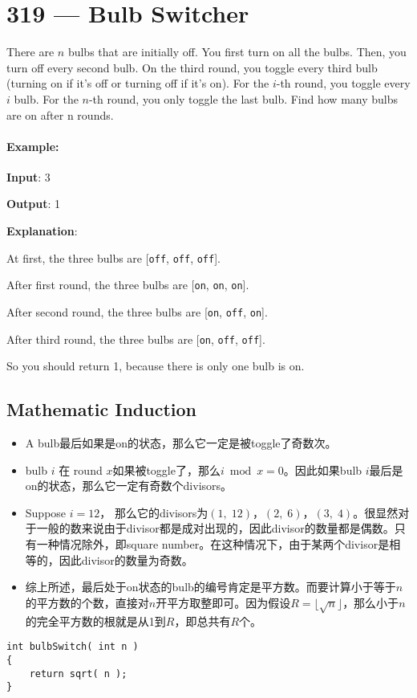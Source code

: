 \section{319 --- Bulb Switcher}
There are $ n $ bulbs that are initially off. You first turn on all the bulbs. Then, you turn off every second bulb. On the third round, you toggle every third bulb (turning on if it's off or turning off if it's on). For the $ i $-th round, you toggle every $ i $ bulb. For the $ n $-th round, you only toggle the last bulb. Find how many bulbs are on after n rounds.

\paragraph{Example:}

\begin{flushleft}
\textbf{Input}: 3

\textbf{Output}: 1 

\textbf{Explanation}: 

At first, the three bulbs are [\texttt{off}, \texttt{off}, \texttt{off}].

After first round, the three bulbs are [\texttt{on}, \texttt{on}, \texttt{on}].

After second round, the three bulbs are [\texttt{on}, \texttt{off}, \texttt{on}].

After third round, the three bulbs are [\texttt{on}, \texttt{off}, \texttt{off}]. 

So you should return 1, because there is only one bulb is on.
\end{flushleft}
\subsection{Mathematic Induction}
\begin{itemize}
\item A bulb最后如果是on的状态，那么它一定是被toggle了奇数次。
\item bulb $ i $ 在 round $ x $如果被toggle了，那么$ i\bmod x = 0 $。因此如果bulb $ i $最后是on的状态，那么它一定有奇数个divisors。
\item Suppose $ i=12 $， 那么它的divisors为$ (1,\;12) $，$ (2,\;6) $，$ (3,\;4) $。很显然对于一般的数来说由于divisor都是成对出现的，因此divisor的数量都是偶数。只有一种情况除外，即square number。在这种情况下，由于某两个divisor是相等的，因此divisor的数量为奇数。
\item 综上所述，最后处于on状态的bulb的编号肯定是平方数。而要计算小于等于$ n $的平方数的个数，直接对$n$开平方取整即可。因为假设$R=\lfloor\sqrt{n}\rfloor$，那么小于$ n $的完全平方数的根就是从1到$ R $，即总共有$R$个。
\end{itemize}
\setcounter{lstlisting}{0}
\begin{lstlisting}[style=customc, caption={Count Of Square Numbers}]
int bulbSwitch( int n )
{
    return sqrt( n );
}
\end{lstlisting}